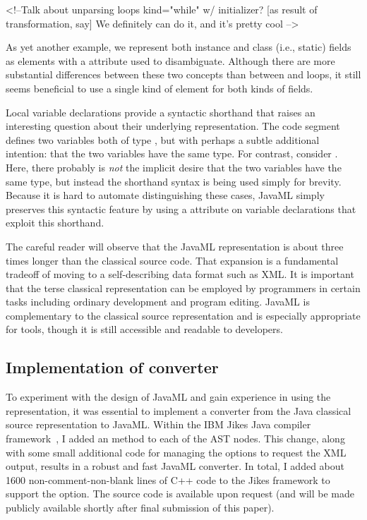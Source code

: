 \documentclass{article}
\begin{document}
  <!--Talk about unparsing loops kind="while" w/ initializer? [as result
  of transformation, say] We definitely can do it, and it's pretty cool
  -->
      
As yet another example, we represent both instance and class (i.e.,
static) fields as  elements with a 
attribute used to disambiguate.  Although there are more substantial
differences between these two concepts than between 
and  loops, it still seems beneficial to use a single
kind of element for both kinds of fields.

Local variable declarations provide a syntactic shorthand that raises an
interesting question about their underlying representation.  The code
segment 
defines two variables both of type , but with perhaps a
subtle additional intention: that the two variables have the same type.
For contrast, consider .
Here, there probably is \emph{not} the implicit desire that the two
variables have the same type, but instead the shorthand syntax is being
used simply for brevity.  Because it is hard to automate distinguishing
these cases, JavaML simply preserves this syntactic feature by using a
 attribute on variable declarations that
exploit this shorthand.

The careful reader will observe that the JavaML representation is 
about three times longer than the classical source code.  That expansion is a fundamental
tradeoff of moving to a self-describing data format such as XML.
It is important that the terse classical representation can be employed by programmers in
certain tasks including ordinary development and program editing.
JavaML is complementary to the classical source representation and is especially appropriate
for tools, though it is still accessible and readable to developers.

\subsection{Implementation of converter}

To experiment with the design of JavaML and gain experience in using the
representation, it was essential to implement a converter from the Java
classical source representation to JavaML.  Within the IBM Jikes Java
compiler framework~\cite{Jikes}, I added an
 method to each of the AST nodes. This change,
along with some small additional code for managing the options to
request the XML output, results in a robust and fast 
JavaML converter.  In total, I added about 1600 non-comment-non-blank
lines of C++ code to the Jikes framework to support the option.  The
source code is available upon request (and will be made publicly
available shortly after final submission of this paper).
\end{document}
